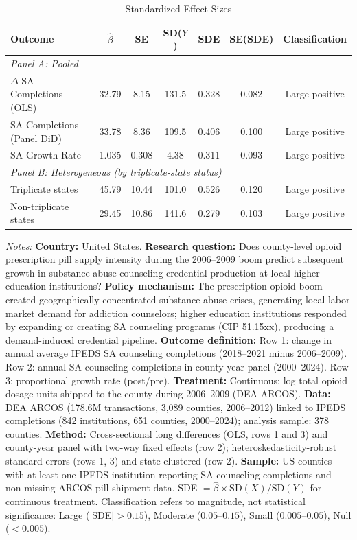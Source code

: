 \begin{table}[htbp]
\centering
\caption{Standardized Effect Sizes}
\label{tab:sde}
\begin{threeparttable}
\begin{tabular}{lcccccc}
\toprule
Outcome & $\hat{\beta}$ & SE & SD($Y$) & SDE & SE(SDE) & Classification \\
\midrule
\multicolumn{7}{l}{\textit{Panel A: Pooled}} \\
$\Delta$ SA Completions (OLS) & 32.79 & 8.15 & 131.5 & 0.328 & 0.082 & Large positive \\
SA Completions (Panel DiD) & 33.78 & 8.36 & 109.5 & 0.406 & 0.100 & Large positive \\
SA Growth Rate & 1.035 & 0.308 & 4.38 & 0.311 & 0.093 & Large positive \\
\midrule
\multicolumn{7}{l}{\textit{Panel B: Heterogeneous (by triplicate-state status)}} \\
Triplicate states & 45.79 & 10.44 & 101.0 & 0.526 & 0.120 & Large positive \\
Non-triplicate states & 29.45 & 10.86 & 141.6 & 0.279 & 0.103 & Large positive \\
\bottomrule
\end{tabular}
\begin{tablenotes}[flushleft]\small
\item \textit{Notes:} \textbf{Country:} United States. \textbf{Research question:} Does county-level opioid prescription pill supply intensity during the 2006--2009 boom predict subsequent growth in substance abuse counseling credential production at local higher education institutions? \textbf{Policy mechanism:} The prescription opioid boom created geographically concentrated substance abuse crises, generating local labor market demand for addiction counselors; higher education institutions responded by expanding or creating SA counseling programs (CIP 51.15xx), producing a demand-induced credential pipeline. \textbf{Outcome definition:} Row 1: change in annual average IPEDS SA counseling completions (2018--2021 minus 2006--2009). Row 2: annual SA counseling completions in county-year panel (2000--2024). Row 3: proportional growth rate (post/pre). \textbf{Treatment:} Continuous: log total opioid dosage units shipped to the county during 2006--2009 (DEA ARCOS). \textbf{Data:} DEA ARCOS (178.6M transactions, 3,089 counties, 2006--2012) linked to IPEDS completions (842 institutions, 651 counties, 2000--2024); analysis sample: 378 counties. \textbf{Method:} Cross-sectional long differences (OLS, rows 1 and 3) and county-year panel with two-way fixed effects (row 2); heteroskedasticity-robust standard errors (rows 1, 3) and state-clustered (row 2). \textbf{Sample:} US counties with at least one IPEDS institution reporting SA counseling completions and non-missing ARCOS pill shipment data. SDE $= \hat{\beta} \times \text{SD}(X) / \text{SD}(Y)$ for continuous treatment. Classification refers to magnitude, not statistical significance: Large ($|$SDE$| > 0.15$), Moderate ($0.05$--$0.15$), Small ($0.005$--$0.05$), Null ($< 0.005$).
\end{tablenotes}
\end{threeparttable}
\end{table}

